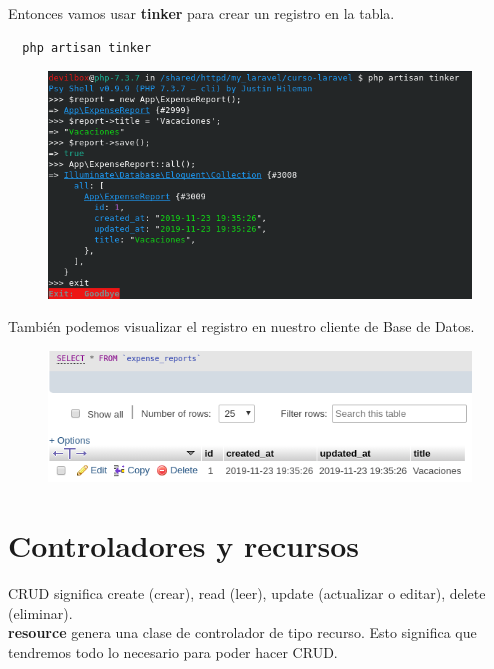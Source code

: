 \documentclass{article}
\begin{document}
\newpage

Entonces vamos usar \textbf{tinker} para crear un registro en la tabla.

\begin{verbatim}
  php artisan tinker
\end{verbatim}

\begin{figure}[h!]
  \centering
  \includegraphics[scale=0.75]{./Pictures/047_new_reg_tinker.png}
\end{figure}

También podemos visualizar el registro en nuestro cliente de Base de Datos.

\begin{figure}[h!]
  \centering
  \includegraphics[scale=0.75]{./Pictures/048_expense_report.png}
\end{figure}

\newpage


\section{Controladores y recursos}%
CRUD significa create (crear), read (leer), update (actualizar o editar),
delete (eliminar).\\

\textbf{resource} genera una clase de controlador de tipo recurso. Esto
significa que tendremos todo lo necesario para poder hacer CRUD.\\
\end{document}
